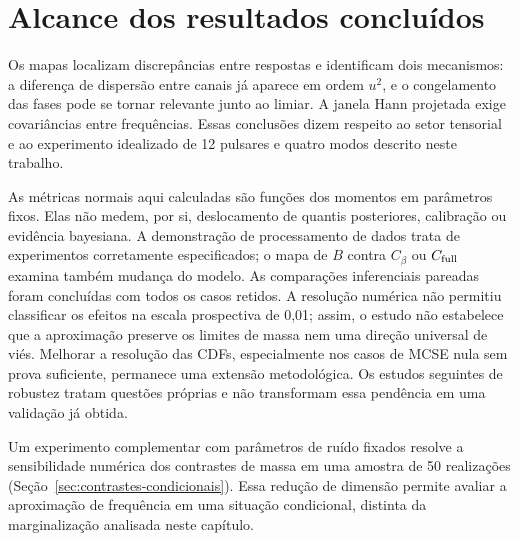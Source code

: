 \section{Alcance dos resultados concluídos}

Os mapas localizam discrepâncias entre respostas e identificam dois
mecanismos: a diferença de dispersão entre canais já aparece em ordem
$u^2$, e o congelamento das fases pode se tornar relevante junto ao limiar.
A janela Hann projetada exige covariâncias entre frequências. Essas
conclusões dizem respeito ao setor tensorial e ao experimento idealizado
de 12 pulsares e quatro modos descrito neste trabalho.

As métricas normais aqui calculadas são funções dos momentos em parâmetros
fixos. Elas não medem, por si, deslocamento de quantis posteriores,
calibração ou evidência bayesiana. A demonstração de processamento de dados
trata de experimentos corretamente especificados; o mapa de $B$ contra
$C_\beta$ ou $C_{\rm full}$ examina também mudança do modelo.
As comparações inferenciais pareadas foram concluídas com todos os
casos retidos. A resolução numérica não permitiu classificar os efeitos
na escala prospectiva de 0,01; assim, o estudo não estabelece que a
aproximação preserve os limites de massa nem uma direção universal de
viés. Melhorar a resolução das CDFs, especialmente nos casos de MCSE
nula sem prova suficiente, permanece uma extensão metodológica.
Os estudos seguintes de robustez tratam questões próprias e não
transformam essa pendência em uma validação já obtida.

Um experimento complementar com parâmetros de ruído fixados resolve a sensibilidade numérica dos contrastes de massa em uma amostra de 50 realizações (Seção~\ref{sec:contrastes-condicionais}). Essa redução de dimensão permite avaliar a aproximação de frequência em uma situação condicional, distinta da marginalização analisada neste capítulo.
